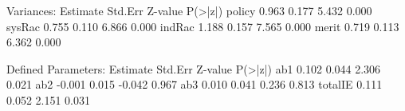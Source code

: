 \begin{Schunk}
\begin{Soutput}
Variances:
                   Estimate  Std.Err  Z-value  P(>|z|)
    policy            0.963    0.177    5.432    0.000
    sysRac            0.755    0.110    6.866    0.000
    indRac            1.188    0.157    7.565    0.000
    merit             0.719    0.113    6.362    0.000

Defined Parameters:
                   Estimate  Std.Err  Z-value  P(>|z|)
    ab1               0.102    0.044    2.306    0.021
    ab2              -0.001    0.015   -0.042    0.967
    ab3               0.010    0.041    0.236    0.813
    totalIE           0.111    0.052    2.151    0.031
\end{Soutput}
\end{Schunk}
